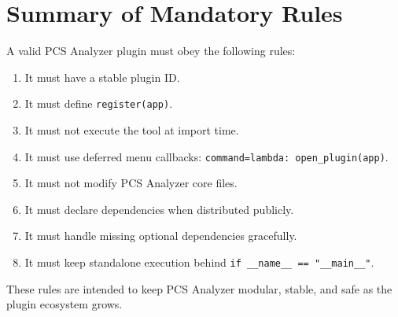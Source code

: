 \documentclass[11pt, a4paper]{article}
\begin{document}
\section{Summary of Mandatory Rules}

A valid PCS Analyzer plugin must obey the following rules:

\begin{enumerate}
  \item It must have a stable plugin ID.
  \item It must define \texttt{register(app)}.
  \item It must not execute the tool at import time.
  \item It must use deferred menu callbacks: \texttt{command=lambda: open\_plugin(app)}.
  \item It must not modify PCS Analyzer core files.
  \item It must declare dependencies when distributed publicly.
  \item It must handle missing optional dependencies gracefully.
  \item It must keep standalone execution behind \texttt{if \_\_name\_\_ == "\_\_main\_\_"}.
\end{enumerate}

These rules are intended to keep PCS Analyzer modular, stable, and safe as the plugin ecosystem grows.
\end{document}
